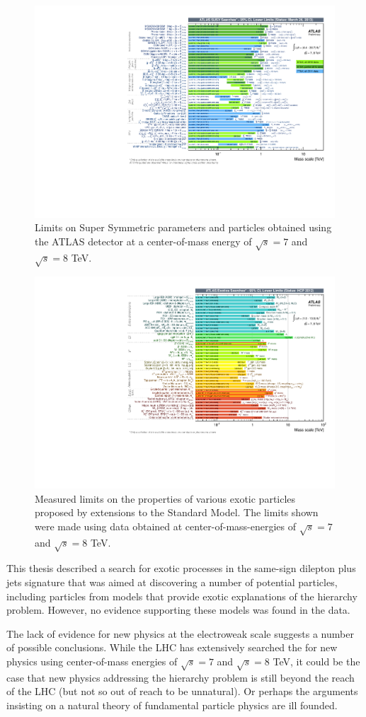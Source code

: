 \begin{figure}[ht!]
  \begin{center}
    \includegraphics[width=.75\textwidth]{figures/conclusion/Susy}
    \caption{Limits on Super Symmetric parameters and particles obtained using the ATLAS detector at a center-of-mass energy of $\sqrt{s}=7$ and $\sqrt{s} = 8$ TeV.}
    \label{fig:susy}
  \end{center}
\end{figure}


\begin{figure}[ht!]
  \begin{center}
    \includegraphics[width=.75\textwidth]{figures/conclusion/ExoticResultsSummary}
    \caption{Measured limits on the properties of various exotic particles proposed by extensions to the Standard Model. The limits shown were made using data obtained at center-of-mass-energies of $\sqrt{s}=7$ and $\sqrt{s} = 8$ TeV.}
    \label{fig:xsec_vs_roots}
  \end{center}
\end{figure}

This thesis described a search for exotic processes in the same-sign dilepton plus jets signature that
was aimed at discovering a number of potential particles, including particles from models that provide
exotic explanations of the hierarchy problem.
However, no evidence supporting these models was found in the data.

The lack of evidence for new physics at the electroweak scale suggests a number of possible conclusions.
While the LHC has extensively searched the for new physics using center-of-mass energies of $\sqrt{s}=7$ and $\sqrt{s} = 8$ TeV,
it could be the case that new physics addressing the hierarchy problem is still beyond the reach
of the LHC (but not so out of reach to be unnatural).
Or perhaps the arguments insisting on a natural theory of fundamental particle physics are ill founded.
